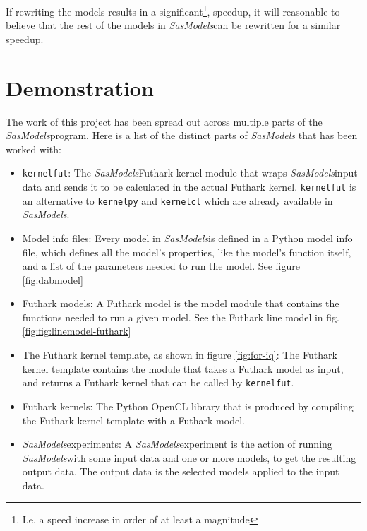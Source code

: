 \documentclass[11pt]{article}
\newcommand{\sasmodels}{\textit{SasModels}}
\begin{document}
If rewriting the models results in a significant\footnote{I.e. a speed increase
  in order of at least a magnitude}, speedup, it will reasonable to believe that 
  the rest of the models in \sasmodels can be rewritten for a similar
  speedup.

\section{Demonstration}
\begin{mdframed}[frametitle={Terminology:}]
  The work of this project has been spread out across multiple parts
  of the \sasmodels program. Here is a list of the distinct parts of \sasmodels
  that has been worked with:
  \begin{itemize}
    \item \texttt{kernelfut}: The \sasmodels Futhark kernel module that wraps 
    \sasmodels input data and sends it to be calculated in the actual Futhark 
    kernel. \texttt{kernelfut} is an alternative to \texttt{kernelpy} and
    \texttt{kernelcl} which are already available in \sasmodels.

    \item Model info files: Every model in \sasmodels is defined in a Python 
    model info file, which defines all the model's properties, like the model's
    function itself, and a list of the parameters needed to run the model.
    See figure \ref{fig:dabmodel}

    \item Futhark models: A Futhark model is the model module that contains the
    functions needed to run a given model. See the Futhark line model in fig. 
    \ref{fig:fig:linemodel-futhark}
    
    \item The Futhark kernel template, as shown in figure \ref{fig:for-iq}:
    The Futhark kernel template contains the module that takes a Futhark
    model as input, and returns a Futhark kernel that can be called by 
    \texttt{kernelfut}.
    
    \item Futhark kernels: The Python OpenCL library that is produced by 
    compiling the Futhark kernel template with a Futhark model.

    \item \sasmodels experiments: A \sasmodels experiment is the action of 
    running \sasmodels with some input data and one or more models, to get 
    the resulting output data. The output data is the selected models applied
    to the input data.
  \end{itemize}
  
\end{mdframed}
\end{document}
